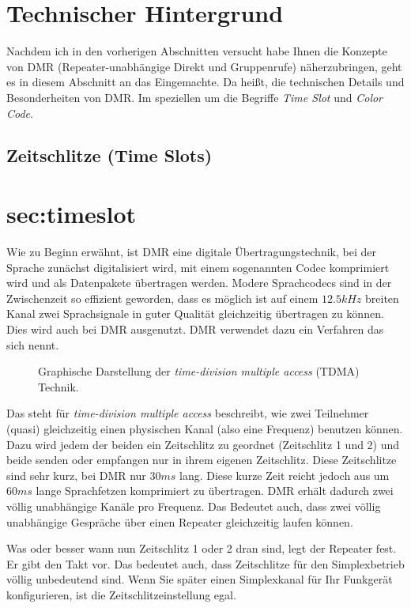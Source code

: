 \section{Technischer Hintergrund} \label{sec:technik}
Nachdem ich in den vorherigen Abschnitten versucht habe Ihnen die Konzepte von DMR (Repeater-unabhängige Direkt und Gruppenrufe) näherzubringen, geht es in diesem Abschnitt an das Eingemachte. Da heißt, die technischen Details und Besonderheiten von DMR. Im speziellen um die Begriffe \emph{Time Slot} und \emph{Color Code}.

\subsection{Zeitschlitze (Time Slots)} \section{sec:timeslot}
Wie zu Beginn erwähnt, ist DMR eine digitale Übertragungstechnik, bei der Sprache zunächst digitalisiert wird, mit einem sogenannten Codec komprimiert wird und als Datenpakete übertragen werden. Modere Sprachcodecs sind in der Zwischenzeit so effizient geworden, dass es möglich ist auf einem $12.5 kHz$ breiten Kanal zwei Sprachsignale in guter Qualität gleichzeitig übertragen zu können. Dies wird auch bei DMR ausgenutzt. DMR verwendet dazu ein Verfahren das sich  nennt. 

\begin{figure}[!ht]
 \centering
 
 \caption{Graphische Darstellung der \emph{time-division multiple access} (TDMA) Technik.}
\end{figure}

Das steht für \emph{time-division multiple access} beschreibt, wie zwei Teilnehmer (quasi) gleichzeitig einen physischen Kanal (also eine Frequenz) benutzen können. Dazu wird jedem der beiden ein Zeitschlitz zu geordnet (Zeitschlitz 1 und 2) und beide senden oder empfangen nur in ihrem eigenen Zeitschlitz. Diese Zeitschlitze sind sehr kurz, bei DMR nur $30ms$ lang. Diese kurze Zeit reicht jedoch aus um $60ms$ lange Sprachfetzen komprimiert zu übertragen. DMR erhält dadurch zwei völlig unabhängige Kanäle pro Frequenz. Das Bedeutet auch, dass zwei völlig unabhängige Gespräche über einen Repeater gleichzeitig laufen können.

Was oder besser wann nun Zeitschlitz 1 oder 2 dran sind, legt der Repeater fest. Er gibt den Takt vor. Das bedeutet auch, dass Zeitschlitze für den Simplexbetrieb völlig unbedeutend sind. Wenn Sie später einen Simplexkanal für Ihr Funkgerät konfigurieren, ist die Zeitschlitzeinstellung egal.

